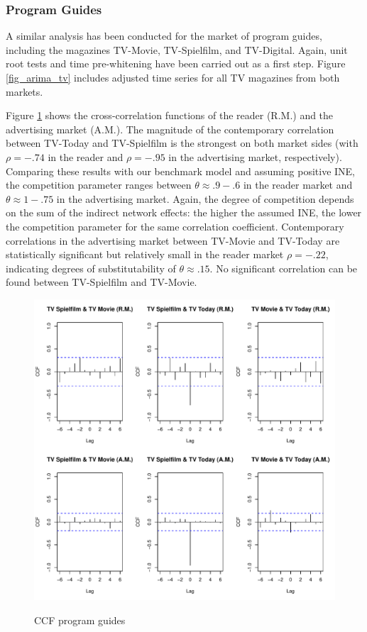 \documentclass[12pt,a4paper,notitlepage]{article}
\begin{document}
\subsubsection{Program Guides}

A similar analysis has been conducted for the market of program guides, including the magazines TV-Movie, TV-Spielfilm, and TV-Digital. 
Again, unit root tests and time pre-whitening have been carried out as a first step. Figure \ref{fig_arima_tv} includes adjusted time series for all TV magazines from both markets.  

Figure \ref{fig_ccf_tv} shows the cross-correlation functions of the reader (R.M.) and the advertising market (A.M.). The magnitude of the contemporary correlation between TV-Today and TV-Spielfilm is the strongest on both market sides (with $\rho=-.74$ in the reader and $\rho=-.95$ in the advertising market, respectively). Comparing these results with our benchmark model and assuming positive INE, the competition parameter ranges between $\theta\approx.9-.6$ in the reader market and $\theta\approx1-.75$ in the advertising market. Again, the degree of competition depends on the sum of the indirect network effects: the higher the assumed INE, the lower the competition parameter for the same correlation coefficient. Contemporary correlations in the advertising market between TV-Movie and TV-Today are statistically significant but relatively small in the reader market $\rho=-.22$, indicating degrees of substitutability of $\theta\approx.15$. No significant correlation can be found between TV-Spielfilm and TV-Movie.

\begin{figure}[H]
\caption{CCF program guides}
	\centering
	\includegraphics[scale=0.5]{../figs/ccf_tv}
	\label{fig_ccf_tv}
\end{figure}
\end{document}
